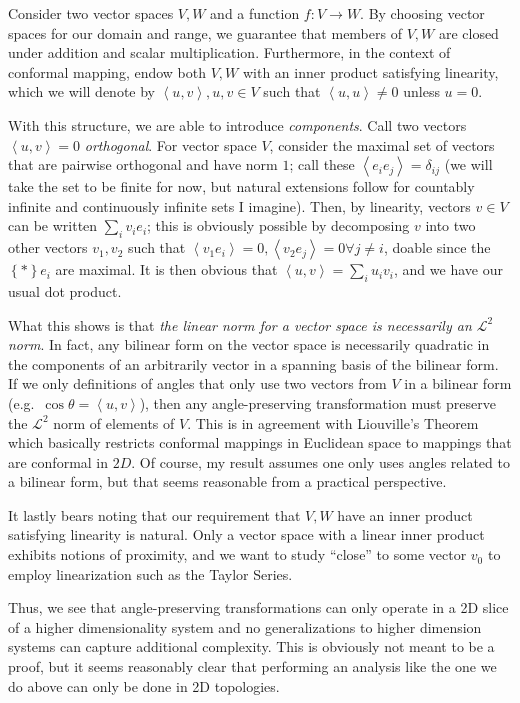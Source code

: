 \documentclass[12pt]{report}
\newcommand*{\ev}[1]{\left\langle#1\right\rangle}
\newcommand*{\z}[1]{\left\{#1\right\}}
\begin{document}
Consider two vector spaces $V, W$ and a function $f: V \to W$. By choosing
vector spaces for our domain and range, we guarantee that members of $V, W$ are
closed under addition and scalar multiplication. Furthermore, in the context of
conformal mapping, endow both $V, W$ with an inner product satisfying linearity,
which we will denote by $\ev{u, v}, u, v \in V$ such that $\ev{u, u}
\neq 0$ unless $u = 0$.

With this structure, we are able to introduce \emph{components}. Call two
vectors $\ev{u, v} = 0$ \emph{orthogonal}. For vector space $V$, consider
the maximal set of vectors that are pairwise orthogonal and have norm $1$; call
these $\ev{e_i e_j} = \delta_{ij}$ (we will take the set to be finite for
now, but natural extensions follow for countably infinite and continuously
infinite sets I imagine). Then, by linearity, vectors $v \in V$ can be written
$\sum\limits_i v_ie_i$; this is obviously possible by decomposing $v$ into two
other vectors $v_1, v_2$ such that $\ev{v_1 e_i} = 0, \ev{v_2e_j} =
0 \forall j \neq i$, doable since the $\z*{e_i}$ are maximal. It is then obvious
that $\ev{u, v} = \sum\limits_i u_iv_i$, and we have our usual dot
product.

What this shows is that \emph{the linear norm for a vector space is necessarily
an $\mathcal{L}^2$ norm}. In fact, any bilinear form on the vector space is
necessarily quadratic in the components of an arbitrarily vector in a spanning
basis of the bilinear form. If we only definitions of angles that only use two
vectors from $V$ in a bilinear form (e.g.\ $\cos\theta = \ev{u, v}$), then
any angle-preserving transformation must preserve the $\mathcal{L}^2$ norm of
elements of $V$. This is in agreement with Liouville's Theorem which basically
restricts conformal mappings in Euclidean space to mappings that are conformal
in $2D$. Of course, my result assumes one only uses angles related to a bilinear
form, but that seems reasonable from a practical perspective.

It lastly bears noting that our requirement that $V, W$ have an inner product
satisfying linearity is natural. Only a vector space with a linear inner product
exhibits notions of proximity, and we want to study ``close'' to some vector
$v_0$ to employ linearization such as the Taylor Series.

Thus, we see that angle-preserving transformations can only operate in a 2D
slice of a higher dimensionality system and no generalizations to higher
dimension systems can capture additional complexity. This is obviously not meant
to be a proof, but it seems reasonably clear that performing an analysis like
the one we do above can only be done in 2D topologies.
\end{document}
